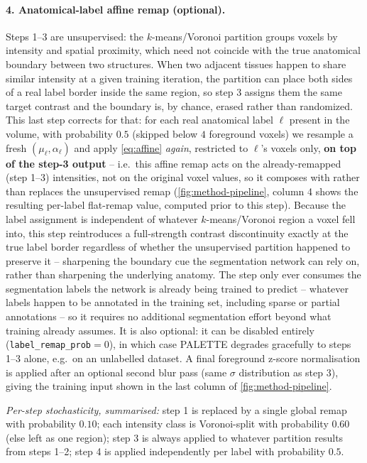 \paragraph{4. Anatomical-label affine remap (optional).} Steps 1--3 are
unsupervised: the $k$-means/Voronoi partition groups voxels by intensity
and spatial proximity, which need not coincide with the true anatomical
boundary between two structures. When two adjacent tissues happen to
share similar intensity at a given training iteration, the partition can
place both sides of a real label border inside the same region, so step 3
assigns them the same target contrast and the boundary is, by chance,
erased rather than randomized. This last step corrects for that: for each
real anatomical label $\ell$ present in the volume, with probability
$0.5$ (skipped below $4$ foreground voxels) we resample a fresh
$(\mu_\ell, \alpha_\ell)$ and apply \cref{eq:affine} \emph{again},
restricted to $\ell$'s voxels only, \textbf{on top of the step-3 output}
-- i.e.\ this affine remap acts on the already-remapped (step 1--3)
intensities, not on the original voxel values, so it composes with rather
than replaces the unsupervised remap (\cref{fig:method-pipeline}, column
4 shows the resulting per-label flat-remap value, computed prior to this
step). Because the label assignment is independent of whatever
$k$-means/Voronoi region a voxel fell into, this step reintroduces a
full-strength contrast discontinuity exactly at the true label border
regardless of whether the unsupervised partition happened to preserve it
-- sharpening the boundary cue the segmentation network can rely on,
rather than sharpening the underlying anatomy. The step only ever
consumes the segmentation labels the network is already being trained to
predict -- whatever labels happen to be annotated in the training set,
including sparse or partial annotations -- so it requires no additional
segmentation effort beyond what training already assumes. It is also
optional: it can be disabled entirely (\texttt{label\_remap\_prob}$=0$),
in which case PALETTE degrades gracefully to steps 1--3 alone, e.g.\ on
an unlabelled dataset. A final foreground z-score normalisation is
applied after an optional second blur pass (same $\sigma$ distribution as
step 3), giving the training input shown in the last column of
\cref{fig:method-pipeline}.

\smallskip\noindent\emph{Per-step stochasticity, summarised:} step 1 is
replaced by a single global remap with probability $0.10$; each
intensity class is Voronoi-split with probability $0.60$ (else left as
one region); step 3 is always applied to whatever partition results from
steps 1--2; step 4 is applied independently per label with probability
$0.5$.

